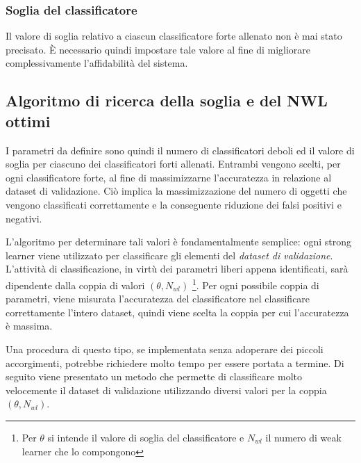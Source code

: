             \subsubsection{Soglia del classificatore}
                Il valore di soglia relativo a ciascun classificatore forte allenato non è mai stato precisato.
                È necessario quindi impostare tale valore al fine di migliorare complessivamente l'affidabilità del sistema.

        \subsection{Algoritmo di ricerca della soglia e del NWL ottimi}
            I parametri da definire sono quindi il numero di classificatori deboli ed il valore di soglia per ciascuno dei classificatori forti allenati.
            Entrambi vengono scelti, per ogni classificatore forte, al fine di massimizzarne l'accuratezza in relazione al dataset di validazione.
            Ciò implica la massimizzazione del numero di oggetti che vengono classificati correttamente e la conseguente riduzione dei falsi positivi e negativi.

            L'algoritmo per determinare tali valori è fondamentalmente semplice: ogni strong learner viene utilizzato per classificare gli elementi del \emph{dataset di validazione}.
            L'attività di classificazione, in virtù dei parametri liberi appena identificati, sarà dipendente dalla coppia di valori $(\theta, N_{wl})$ \footnote{Per $\theta$ si intende il valore di soglia del classificatore e $N_{wl}$ il numero di weak learner che lo compongono}.
            Per ogni possibile coppia di parametri, viene misurata l'accuratezza del classificatore nel classificare correttamente l'intero dataset, quindi viene scelta la coppia per cui l'accuratezza è massima.

            Una procedura di questo tipo, se implementata senza adoperare dei piccoli accorgimenti, potrebbe richiedere molto tempo per essere portata a termine.
            Di seguito viene presentato un metodo che permette di classificare molto velocemente il dataset di validazione utilizzando diversi valori per la coppia $(\theta, N_{wl})$.

